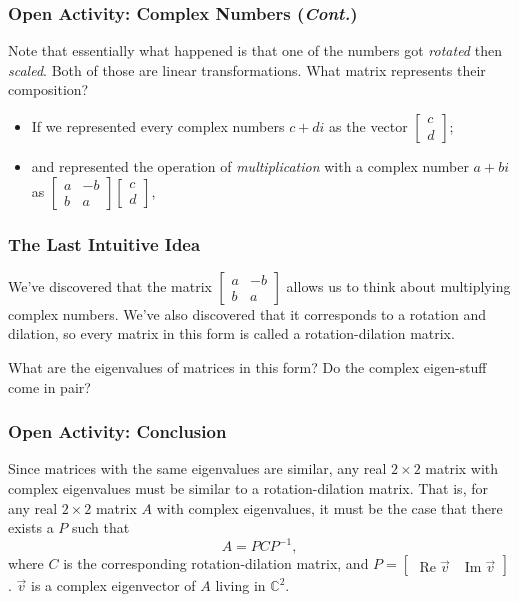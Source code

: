 \documentclass{beamer}
\DeclareMathOperator{\re}{Re}
\DeclareMathOperator{\im}{Im}
\begin{document}
	\begin{frame}
		\frametitle{Open Activity: Complex Numbers (\textit{Cont.})}
		Note that essentially what happened is that one of the numbers got \emph{rotated} then \emph{scaled}. Both of those are linear transformations. 
		What matrix represents their composition? \pause
		\begin{itemize}
			\item<2-> If we represented every complex numbers \(c + di\) as the vector \(\begin{bmatrix}c \\ d\end{bmatrix}\);
			\item<3-> and represented the operation of \emph{multiplication} with a complex number \(a + bi\) as \(\begin{bmatrix}a & -b \\ b & a\end{bmatrix}\begin{bmatrix}c \\ d\end{bmatrix}\),
		\end{itemize}
	\end{frame}

	\begin{frame}
		\frametitle{The Last Intuitive Idea}
		We've discovered that the matrix \(\begin{bmatrix}a & -b \\ b & a\end{bmatrix}\) allows us to think about multiplying complex numbers. We've also
		discovered that it corresponds to a rotation and dilation, so every matrix in this form is called a rotation-dilation matrix. \pause

		What are the eigenvalues of matrices in this form? \pause
		Do the complex eigen-stuff come in pair?
	\end{frame}

	\begin{frame}
		\frametitle{Open Activity: Conclusion}
		Since matrices with the same eigenvalues are similar, any real \(2 \times 2\) matrix with complex eigenvalues must be similar to a rotation-dilation 
		matrix. That is, for any real \(2 \times 2\) matrix \(A\) with complex eigenvalues, it must be the case that there exists a \(P\) such that 
		\[A = PCP^{-1},\] where \(C\) is the corresponding rotation-dilation matrix, and \(P = \begin{bmatrix}\re \vec{v} & \im \vec{v}\end{bmatrix}\). 
		\(\vec{v}\) is a complex eigenvector of \(A\) living in \(\mathbb{C}^2\).
	\end{frame}
\end{document}

